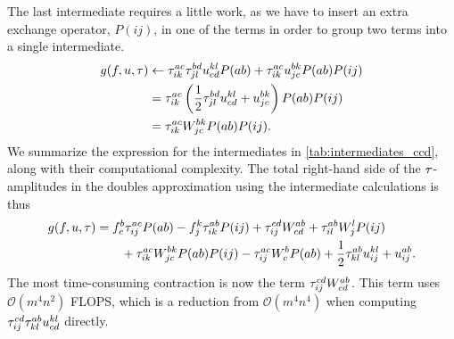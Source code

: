         The last intermediate requires a little work, as we have to insert an
        extra exchange operator, $P(ij)$, in one of the terms in order to group
        two terms into a single intermediate.
        \begin{align}
            g(f, u, \tau)
            &\gets
            \tau^{ac}_{ik} \tau^{bd}_{jl} u^{kl}_{cd} P(ab)
            + \tau^{ac}_{ik} u^{bk}_{jc} P(ab) P(ij)
            \\
            &= \tau^{ac}_{ik}\left( 
                \frac{1}{2} \tau^{bd}_{jl} u^{kl}_{cd}
                + u^{bk}_{jc}
             \right) P(ab) P(ij)
            \\
            &= \tau^{ac}_{ik} W^{bk}_{jc} P(ab) P(ij).
        \end{align}
        We summarize the expression for the intermediates in
        \autoref{tab:intermediates_ccd}, along with their computational
        complexity. The total right-hand side of the $\tau$-amplitudes in the
        doubles approximation using the intermediate calculations is thus
        \begin{align}
            g(f, u, \tau)
            &=
            f^{b}_{c} \tau^{ac}_{ij} P(ab)
            - f^{k}_{j} \tau^{ab}_{ik} P(ij)
            + \tau^{cd}_{ij} W^{ab}_{cd}
            + \tau^{ab}_{il} W^{l}_{j} P(ij)
            \nonumber \\
            &\qquad
            + \tau^{ac}_{ik} W^{bk}_{jc} P(ab) P(ij)
            - \tau^{ac}_{ij} W^{b}_{c} P(ab)
            + \frac{1}{2} \tau^{ab}_{kl} u^{kl}_{ij}
            + u^{ab}_{ij}.
        \end{align}
        The most time-consuming contraction is now the term $\tau^{cd}_{ij}
        W^{ab}_{cd}$. This term uses $\mathcal{O}(m^4 n^2)$ FLOPS, which is a
        reduction from $\mathcal{O}(m^4 n^4)$ when computing $\tau^{cd}_{ij}
        \tau^{ab}_{kl} u^{kl}_{cd}$ directly.

